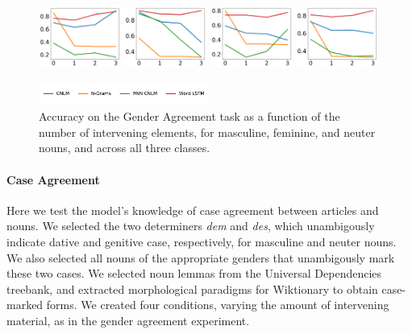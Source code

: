 \begin{figure}
\includegraphics[width=0.24\textwidth]{figures/german-gender-m.pdf}
\includegraphics[width=0.24\textwidth]{figures/german-gender-f.pdf}
\includegraphics[width=0.24\textwidth]{figures/german-gender-n.pdf}
\includegraphics[width=0.24\textwidth]{figures/german-gender-total.pdf}

\centering\includegraphics[width=0.5\textwidth]{figures/german-legend.pdf}
\caption{Accuracy on the Gender Agreement task as a function of the number of intervening elements, for masculine, feminine, and neuter nouns, and across all three classes.}\label{fig:gender}
\end{figure}


\paragraph{Case Agreement}
Here we test the model's knowledge of case agreement between articles and nouns.
We selected the two determiners \emph{dem} and \emph{des}, which unambigously indicate dative and genitive case, respectively, for masculine and neuter nouns.
We also selected all nouns of the appropriate genders that unambigously mark these two cases.
We selected noun lemmas from the Universal Dependencies treebank, and extracted morphological paradigms for Wiktionary to obtain case-marked forms.
We created four conditions, varying the amount of intervening material, as in the gender agreement experiment.

